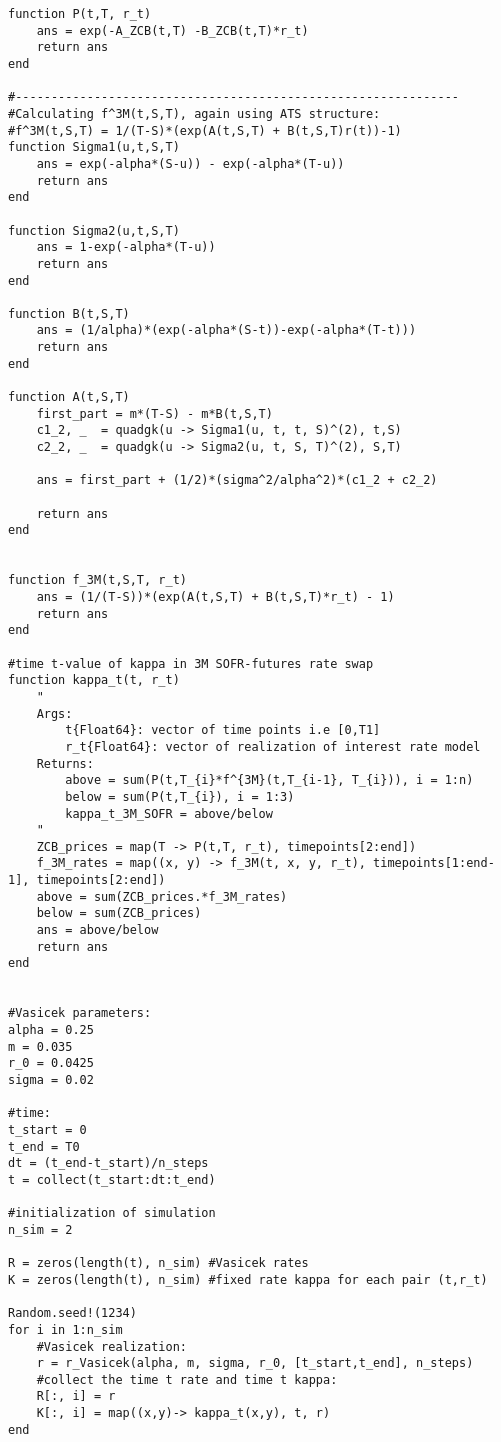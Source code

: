 \begin{verbatim}
function P(t,T, r_t)
    ans = exp(-A_ZCB(t,T) -B_ZCB(t,T)*r_t)
    return ans
end

#--------------------------------------------------------------
#Calculating f^3M(t,S,T), again using ATS structure:
#f^3M(t,S,T) = 1/(T-S)*(exp(A(t,S,T) + B(t,S,T)r(t))-1)
function Sigma1(u,t,S,T)
    ans = exp(-alpha*(S-u)) - exp(-alpha*(T-u))
    return ans   
end

function Sigma2(u,t,S,T)
    ans = 1-exp(-alpha*(T-u))
    return ans
end

function B(t,S,T)
    ans = (1/alpha)*(exp(-alpha*(S-t))-exp(-alpha*(T-t)))
    return ans
end

function A(t,S,T)
    first_part = m*(T-S) - m*B(t,S,T)
    c1_2, _  = quadgk(u -> Sigma1(u, t, t, S)^(2), t,S) 
    c2_2, _  = quadgk(u -> Sigma2(u, t, S, T)^(2), S,T)

    ans = first_part + (1/2)*(sigma^2/alpha^2)*(c1_2 + c2_2)

    return ans
end


function f_3M(t,S,T, r_t)
    ans = (1/(T-S))*(exp(A(t,S,T) + B(t,S,T)*r_t) - 1)
    return ans
end 

#time t-value of kappa in 3M SOFR-futures rate swap
function kappa_t(t, r_t)
    "
    Args: 
        t{Float64}: vector of time points i.e [0,T1]
        r_t{Float64}: vector of realization of interest rate model
    Returns: 
        above = sum(P(t,T_{i}*f^{3M}(t,T_{i-1}, T_{i})), i = 1:n)
        below = sum(P(t,T_{i}), i = 1:3)
        kappa_t_3M_SOFR = above/below
    "
    ZCB_prices = map(T -> P(t,T, r_t), timepoints[2:end])
    f_3M_rates = map((x, y) -> f_3M(t, x, y, r_t), timepoints[1:end-1], timepoints[2:end])
    above = sum(ZCB_prices.*f_3M_rates)
    below = sum(ZCB_prices) 
    ans = above/below
    return ans
end


#Vasicek parameters: 
alpha = 0.25
m = 0.035
r_0 = 0.0425
sigma = 0.02

#time:
t_start = 0 
t_end = T0
dt = (t_end-t_start)/n_steps
t = collect(t_start:dt:t_end)

#initialization of simulation
n_sim = 2

R = zeros(length(t), n_sim) #Vasicek rates
K = zeros(length(t), n_sim) #fixed rate kappa for each pair (t,r_t)

Random.seed!(1234)
for i in 1:n_sim
    #Vasicek realization:
    r = r_Vasicek(alpha, m, sigma, r_0, [t_start,t_end], n_steps)
    #collect the time t rate and time t kappa:
    R[:, i] = r
    K[:, i] = map((x,y)-> kappa_t(x,y), t, r)
end


\end{verbatim}
